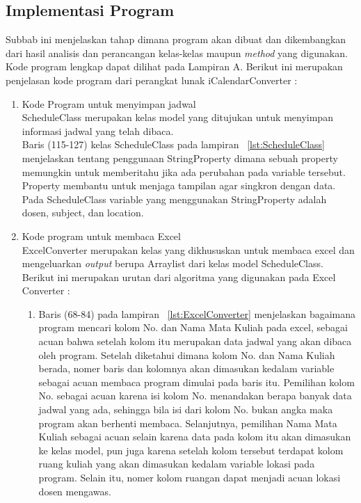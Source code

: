 \subsection{Implementasi Program}
Subbab ini menjelaskan tahap dimana program akan dibuat dan dikembangkan dari hasil analisis dan perancangan kelas-kelas maupun \textit{method} yang digunakan. Kode program lengkap dapat dilihat pada Lampiran A. 
Berikut ini merupakan penjelasan kode program dari perangkat lunak iCalendarConverter :
\begin{enumerate}
	\item Kode Program untuk menyimpan jadwal \\
	ScheduleClass merupakan kelas model yang ditujukan untuk menyimpan informasi jadwal yang telah dibaca.\\
	Baris (115-127) kelas ScheduleClass pada lampiran ~\ref{lst:ScheduleClass} menjelaskan tentang penggunaan StringProperty 
	dimana sebuah property memungkin untuk memberitahu jika ada perubahan pada variable tersebut. Property membantu untuk menjaga tampilan agar singkron dengan data. Pada ScheduleClass variable yang menggunakan StringProperty adalah dosen, subject, dan location.	
	\item Kode program untuk membaca Excel \\
	ExcelConverter merupakan kelas yang dikhususkan untuk membaca excel dan mengeluarkan \textit{output} berupa Arraylist dari kelas model ScheduleClass.\\
	Berikut ini merupakan urutan dari algoritma yang digunakan pada Excel Converter :
\begin{enumerate}
		\item Baris (68-84) pada lampiran ~\ref{lst:ExcelConverter} menjelaskan bagaimana program mencari kolom No. dan Nama Mata Kuliah pada excel, sebagai acuan bahwa setelah kolom itu merupakan data jadwal yang akan dibaca oleh program. Setelah diketahui dimana kolom No. dan Nama Kuliah berada, nomer baris dan kolomnya akan dimasukan kedalam variable sebagai acuan membaca program dimulai pada baris itu. Pemilihan kolom No. sebagai acuan karena isi kolom No. menandakan berapa banyak data jadwal yang ada, sehingga bila isi dari kolom No. bukan angka maka program akan berhenti membaca. Selanjutnya, pemilihan Nama Mata Kuliah sebagai acuan selain karena data pada kolom itu akan dimasukan ke kelas model, pun juga karena setelah kolom tersebut terdapat kolom ruang kuliah yang akan dimasukan kedalam variable lokasi pada program.
		Selain itu, nomer kolom ruangan dapat menjadi acuan lokasi dosen mengawas.

\end{enumerate}
\end{enumerate}
